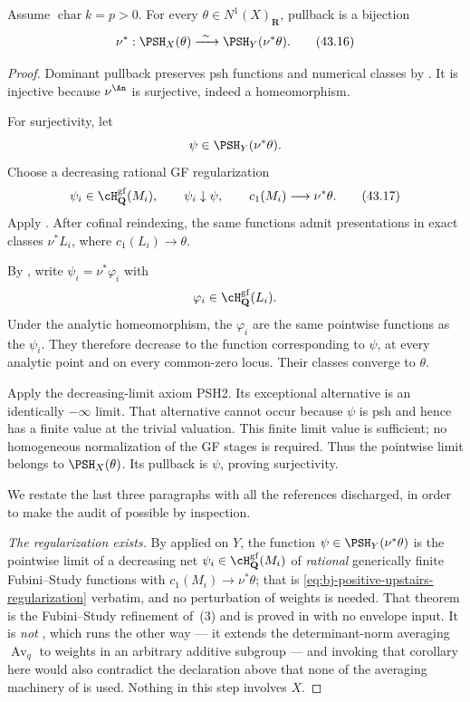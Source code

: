\begin{theorem}\label{thm:bj-positive-universal-reflection}
Assume $\operatorname{char}k=p>0$.
For every $\theta\in N^1(X)_{\mathbf R}$, pullback is a bijection
\[
 \nu^*:\PSH_X(\theta)
       \xrightarrow{\ \sim\ }
       \PSH_Y(\nu^*\theta).
\tag{43.16}\label{eq:bj-positive-universal-reflection}
\]
\end{theorem}

\begin{proof}
Dominant pullback preserves psh functions and numerical classes by
\cite[Theorem~4.7]{BJ22}.
It is injective because $\nu^{\An}$ is surjective, indeed a homeomorphism.

For surjectivity, let
\[
                         \psi\in\PSH_Y(\nu^*\theta).
\]
Choose a decreasing rational GF regularization
\[
 \psi_i\in\cH^{\mathrm{gf}}_{\mathbf Q}(M_i),
 \qquad
 \psi_i\downarrow\psi,
 \qquad
 c_1(M_i)\longrightarrow\nu^*\theta.
\tag{43.17}\label{eq:bj-positive-upstairs-regularization}
\]
Apply .
After cofinal reindexing, the same functions admit presentations in exact
classes $\nu^*L_i$, where $c_1(L_i)\to\theta$.

By , write
$\psi_i=\nu^*\varphi_i$ with
\[
                         \varphi_i\in
                         \cH^{\mathrm{gf}}_{\mathbf Q}(L_i).
\]
Under the analytic homeomorphism, the $\varphi_i$ are the same pointwise
functions as the $\psi_i$.
They therefore decrease to the function corresponding to $\psi$, at every
analytic point and on every common-zero locus.
Their classes converge to $\theta$.

Apply the decreasing-limit axiom PSH2.
Its exceptional alternative is an identically $-\infty$ limit.
That alternative cannot occur because $\psi$ is psh and hence has a finite
value at the trivial valuation.  This finite limit value is sufficient;
no homogeneous normalization of the GF stages is required.
Thus the pointwise limit belongs to $\PSH_X(\theta)$.
Its pullback is $\psi$, proving surjectivity.

We restate the last three paragraphs with all the references discharged, in
order to make the audit of  possible by inspection.

\emph{The regularization exists.}  By 
applied on $Y$, the function $\psi\in\PSH_Y(\nu^*\theta)$ is the
pointwise limit of a decreasing net
$\psi_i\in\cH^{\mathrm{gf}}_{\mathbf Q}(M_i)$ of \emph{rational}
generically finite Fubini--Study functions with $c_1(M_i)\to\nu^*\theta$;
that is \eqref{eq:bj-positive-upstairs-regularization} verbatim, and no
perturbation of weights is needed.  That theorem is the Fubini--Study
refinement of \,(3) and is proved in
 with no envelope input.  It is \emph{not}
, which runs the other way --- it extends the
determinant-norm averaging $\operatorname{Av}_q$ to weights in an arbitrary
additive subgroup --- and invoking that corollary here would also contradict
the declaration above that none of the averaging machinery of
 is used.  Nothing in this step involves
$X$.


\end{proof}

